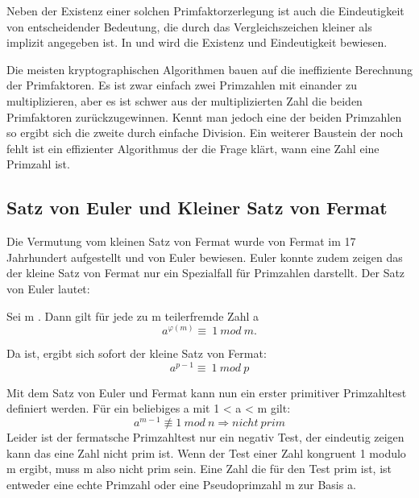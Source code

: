 	Neben der Existenz einer solchen Primfaktorzerlegung ist auch die Eindeutigkeit von entscheidender Bedeutung, die durch das Vergleichszeichen kleiner als implizit angegeben ist. In \cite{Einfuehrung:in:Algebra:und:Zahlentheorie} und \cite{Algorithmische:Zahlentheorie} wird die Existenz und Eindeutigkeit bewiesen.
	
	Die meisten kryptographischen Algorithmen bauen auf die ineffiziente Berechnung der Primfaktoren. Es ist zwar einfach zwei Primzahlen mit einander zu multiplizieren, aber es ist schwer aus der multiplizierten Zahl die beiden Primfaktoren zurückzugewinnen. Kennt man jedoch eine der beiden Primzahlen so ergibt sich die zweite durch einfache Division. Ein weiterer Baustein der noch fehlt ist ein effizienter Algorithmus der die Frage klärt, wann eine Zahl eine Primzahl ist.
		
	\subsection{Satz von Euler und Kleiner Satz von Fermat}
	Die Vermutung vom kleinen Satz von Fermat wurde von Fermat im 17 Jahrhundert aufgestellt und von Euler bewiesen. Euler konnte zudem zeigen das der kleine Satz von Fermat nur ein Spezialfall für Primzahlen darstellt. Der Satz von Euler lautet:
	
	Sei m  \myin {}. Dann gilt für jede zu m teilerfremde Zahl a \myin {}
	\begin{displaymath}
		a^{\varphi(m)} \equiv~1~mod~m.
	\end{displaymath}
	
	Da 	 ist, ergibt sich sofort der kleine Satz von Fermat:
	\begin{displaymath}
		a^{p-1} \equiv~1~mod~p
	\end{displaymath}
		
	Mit dem Satz von Euler und Fermat kann nun ein erster primitiver Primzahltest definiert werden.  
	Für ein beliebiges 	a \myin {} mit 1 < a < m gilt:
	\begin{displaymath}
		a^{m-1} \not\equiv 1~mod~n \Longrightarrow nicht~prim
	\end{displaymath}
	Leider ist der fermatsche Primzahltest nur ein negativ Test, der eindeutig zeigen kann das eine Zahl nicht prim ist. Wenn der Test einer Zahl kongruent 1 modulo m ergibt, muss m also nicht prim sein. Eine Zahl die für den Test prim ist, ist entweder eine echte Primzahl oder eine Pseudoprimzahl m zur Basis a.\cite{Elementare:Zahlentheorie}
		
